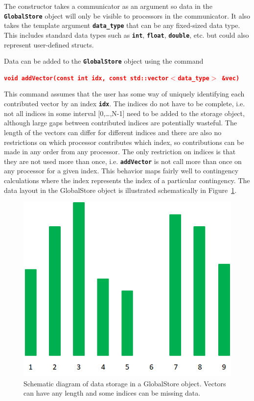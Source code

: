 \documentclass[12pt]{report} %
\begin{document}
The constructor takes a communicator as an argument so data in the \texttt{\textbf{GlobalStore}} object will only be visible to processors in the communicator. It also takes the template argument \texttt{\textbf{data\_type}} that can be any fixed-sized data type. This includes standard data types such as \texttt{\textbf{int}}, \texttt{\textbf{float}}, \texttt{\textbf{double}}, etc. but could also represent user-defined structs.

Data can be added to the \texttt{\textbf{GlobalStore}} object using the command

\textcolor{red}{\texttt{\textbf{void addVector(const int idx, const std::vector$\boldsymbol{\mathrm{<}}$data\_type$\boldsymbol{\mathrm{>}}$ \&vec)}}}

This command assumes that the user has some way of uniquely identifying each contributed vector by an index \texttt{\textbf{idx}}. The indices do not have to be complete, i.e. not all indices in some interval [0,{\dots},N-1] need to be added to the storage object, although large gaps between contributed indices are potentially wasteful. The length of the vectors can differ for different indices and there are also no restrictions on which processor contributes which index, so contributions can be made in any order from any processor. The only restriction on indices is that they are not used more than once, i.e. \texttt{\textbf{addVector}} is not call more than once on any processor for a given index. This behavior maps fairly well to contingency calculations where the index represents the index of a particular contingency. The data layout in the GlobalStore object is illustrated schematically in Figure~\ref{fig:fig-12}.

\begin{figure}
  \centering
    \includegraphics*[width=6.5in, height=3.72in, keepaspectratio=true]{Fig12}
  \caption{Schematic diagram of data storage in a GlobalStore object. Vectors can have any length and some indices can be missing data.}
  \label{fig:fig-12}
\end{figure}
\end{document}
